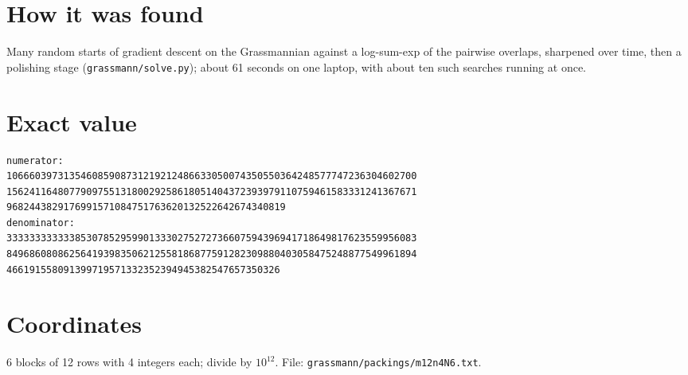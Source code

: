 \documentclass[11pt,a4paper]{article}
\begin{document}
\section{How it was found}
Many random starts of gradient descent on the Grassmannian against a log-sum-exp of the pairwise overlaps, sharpened over time, then a polishing stage (\texttt{grassmann/solve.py}); about 61 seconds on one laptop, with about ten such searches running at once.


\appendix
\section{Exact value}
{\small
\begin{verbatim}
numerator:
106660397313546085908731219212486633050074350550364248577747236304602700
156241164807790975513180029258618051404372393979110759461583331241367671
9682443829176991571084751763620132522642674340819
denominator:
333333333333853078529599013330275272736607594396941718649817623559956083
849686080862564193983506212558186877591282309880403058475248877549961894
466191558091399719571332352394945382547657350326
\end{verbatim}}

\section{Coordinates}
6 blocks of 12 rows with 4 integers each; divide by $10^{12}$. File: \texttt{grassmann/packings/m12n4N6.txt}.
{\tiny
\begin{multicols}{3}
\end{multicols}}
\end{document}
